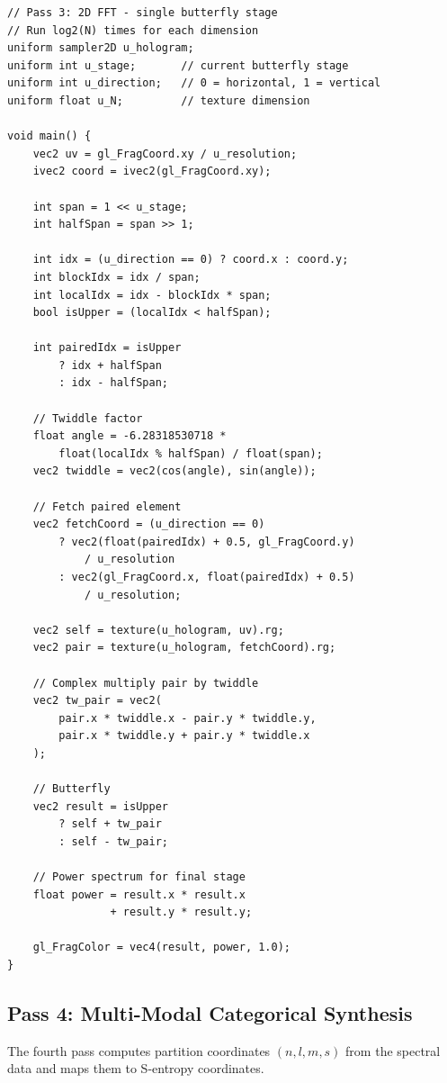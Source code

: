 \documentclass[11pt,a4paper]{article}
\theoremstyle{definition}
\theoremstyle{remark}
\begin{document}
\begin{lstlisting}[style=glsl, caption={Pass 3: 2D FFT butterfly pass}, label={lst:pass3}]
// Pass 3: 2D FFT - single butterfly stage
// Run log2(N) times for each dimension
uniform sampler2D u_hologram;
uniform int u_stage;       // current butterfly stage
uniform int u_direction;   // 0 = horizontal, 1 = vertical
uniform float u_N;         // texture dimension

void main() {
    vec2 uv = gl_FragCoord.xy / u_resolution;
    ivec2 coord = ivec2(gl_FragCoord.xy);

    int span = 1 << u_stage;
    int halfSpan = span >> 1;

    int idx = (u_direction == 0) ? coord.x : coord.y;
    int blockIdx = idx / span;
    int localIdx = idx - blockIdx * span;
    bool isUpper = (localIdx < halfSpan);

    int pairedIdx = isUpper
        ? idx + halfSpan
        : idx - halfSpan;

    // Twiddle factor
    float angle = -6.28318530718 *
        float(localIdx % halfSpan) / float(span);
    vec2 twiddle = vec2(cos(angle), sin(angle));

    // Fetch paired element
    vec2 fetchCoord = (u_direction == 0)
        ? vec2(float(pairedIdx) + 0.5, gl_FragCoord.y)
            / u_resolution
        : vec2(gl_FragCoord.x, float(pairedIdx) + 0.5)
            / u_resolution;

    vec2 self = texture(u_hologram, uv).rg;
    vec2 pair = texture(u_hologram, fetchCoord).rg;

    // Complex multiply pair by twiddle
    vec2 tw_pair = vec2(
        pair.x * twiddle.x - pair.y * twiddle.y,
        pair.x * twiddle.y + pair.y * twiddle.x
    );

    // Butterfly
    vec2 result = isUpper
        ? self + tw_pair
        : self - tw_pair;

    // Power spectrum for final stage
    float power = result.x * result.x
                + result.y * result.y;

    gl_FragColor = vec4(result, power, 1.0);
}
\end{lstlisting}

\subsection{Pass 4: Multi-Modal Categorical Synthesis}

The fourth pass computes partition coordinates $(n, l, m, s)$ from the spectral data and maps them to S-entropy coordinates.
\end{document}
